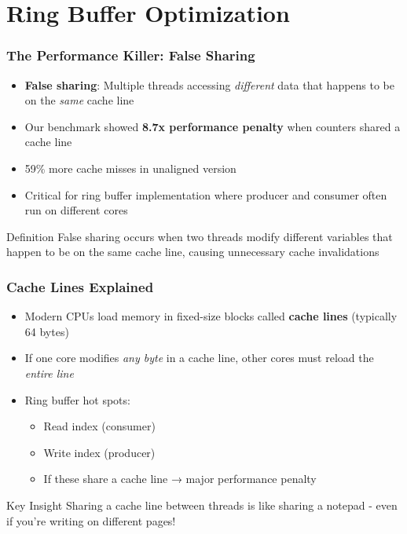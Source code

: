 \documentclass{beamer}
\begin{document}

\section{Ring Buffer Optimization}

\begin{frame}
  \frametitle{The Performance Killer: False Sharing}
  
  \begin{itemize}
    \item \textbf{False sharing}: Multiple threads accessing \textit{different} data that happens to be on the \textit{same} cache line
    \item Our benchmark showed \textbf{8.7x performance penalty} when counters shared a cache line
    \item 59\% more cache misses in unaligned version
    \item Critical for ring buffer implementation where producer and consumer often run on different cores
  \end{itemize}
  
  \begin{alertblock}{Definition}
    False sharing occurs when two threads modify different variables that happen to be on the same cache line, causing unnecessary cache invalidations
  \end{alertblock}
\end{frame}

\begin{frame}
  \frametitle{Cache Lines Explained}
  
  \begin{itemize}
    \item Modern CPUs load memory in fixed-size blocks called \textbf{cache lines} (typically 64 bytes)
    \item If one core modifies \textit{any byte} in a cache line, other cores must reload the \textit{entire line}
    \item Ring buffer hot spots:
    \begin{itemize}
      \item Read index (consumer)
      \item Write index (producer)
      \item If these share a cache line → major performance penalty
    \end{itemize}
  \end{itemize}
  
  \begin{alertblock}{Key Insight}
    Sharing a cache line between threads is like sharing a notepad - even if you're writing on different pages!
  \end{alertblock}
\end{frame}
\end{document}
